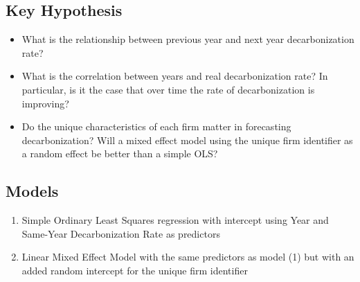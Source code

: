 \subsection{Key Hypothesis}
\begin{itemize}
    \item What is the relationship between previous year and next year decarbonization rate?
    \item What is the correlation between years and real decarbonization rate? In particular, is it the case that over time the rate of decarbonization is improving? 
    \item Do the unique characteristics of each firm matter in forecasting decarbonization? Will a mixed effect model using the unique firm identifier as a random effect be better than a simple OLS?
\end{itemize}

\subsection{Models} 
\begin{enumerate}
    \item Simple Ordinary Least Squares regression with intercept using Year and Same-Year Decarbonization Rate as predictors
    \item Linear Mixed Effect Model with the same predictors as model (1) but with an added random intercept for the unique firm identifier
\end{enumerate}

